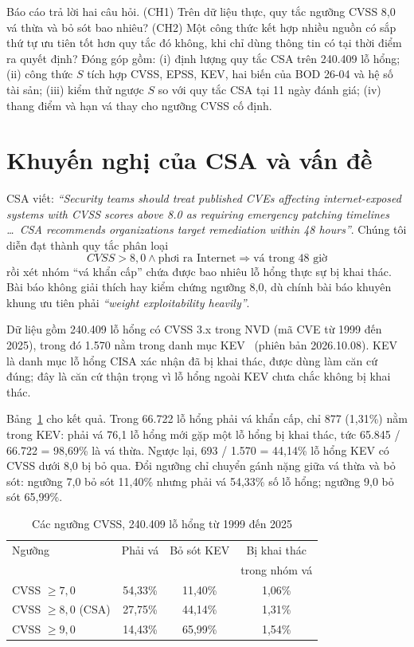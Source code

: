 \documentclass[conference]{IEEEtran}
\begin{document}
Báo cáo trả lời hai câu hỏi. (CH1) Trên dữ liệu thực, quy tắc ngưỡng CVSS 8,0 vá thừa và bỏ sót bao nhiêu? (CH2)
Một công thức kết hợp nhiều nguồn có sắp thứ tự ưu tiên tốt hơn quy tắc đó không, khi chỉ dùng thông tin có tại
thời điểm ra quyết định? Đóng góp gồm: (i) định lượng quy tắc CSA trên 240.409 lỗ hổng; (ii) công thức $S$ tích hợp
CVSS, EPSS, KEV, hai biến của BOD 26-04 và hệ số tài sản; (iii) kiểm thử ngược $S$ so với quy tắc CSA tại 11 ngày
đánh giá; (iv) thang điểm và hạn vá thay cho ngưỡng CVSS cố định.

\section{Khuyến nghị của CSA và vấn đề}\label{sec:csa}

CSA viết: \emph{``Security teams should treat published CVEs affecting internet-exposed systems with CVSS scores
above 8.0 as requiring emergency patching timelines \ldots\ CSA recommends organizations target remediation within
48 hours''}. Chúng tôi diễn đạt thành quy tắc phân loại
\begin{equation}
\mathit{CVSS} > 8{,}0 \wedge \text{phơi ra Internet} \Longrightarrow \text{vá trong 48 giờ}
\label{eq:csa}
\end{equation}
rồi xét nhóm ``vá khẩn cấp'' chứa được bao nhiêu lỗ hổng thực sự bị khai thác. Bài báo không giải thích hay kiểm
chứng ngưỡng 8,0, dù chính bài báo khuyên khung ưu tiên phải \emph{``weight exploitability heavily''}.

Dữ liệu gồm 240.409 lỗ hổng có CVSS 3.x trong NVD (mã CVE từ 1999 đến 2025), trong đó 1.570 nằm trong danh mục
KEV~\cite{kev} (phiên bản 2026.10.08). KEV là danh mục lỗ hổng CISA xác nhận đã bị khai thác, được dùng làm căn cứ
đúng; đây là căn cứ thận trọng vì lỗ hổng ngoài KEV chưa chắc không bị khai thác.

Bảng~\ref{tab:nguong} cho kết quả. Trong 66.722 lỗ hổng phải vá khẩn cấp, chỉ 877 (1,31\%) nằm trong KEV: phải vá
76,1 lỗ hổng mới gặp một lỗ hổng bị khai thác, tức 65.845 / 66.722 = 98,69\% là vá thừa. Ngược lại, 693 / 1.570 =
44,14\% lỗ hổng KEV có CVSS dưới 8,0 bị bỏ qua. Đổi ngưỡng chỉ chuyển gánh nặng giữa vá thừa và bỏ sót: ngưỡng 7,0
bỏ sót 11,40\% nhưng phải vá 54,33\% số lỗ hổng; ngưỡng 9,0 bỏ sót 65,99\%.

\begin{table}[htbp]
\caption{Các ngưỡng CVSS, 240.409 lỗ hổng từ 1999 đến 2025}\label{tab:nguong}
\centering
\begin{tabular}{lccc}
\toprule
Ngưỡng & Phải vá & Bỏ sót KEV & Bị khai thác \\
 & & & trong nhóm vá \\
\midrule
CVSS $\ge 7{,}0$ & 54,33\% & 11,40\% & 1,06\% \\
CVSS $\ge 8{,}0$ (CSA) & 27,75\% & 44,14\% & 1,31\% \\
CVSS $\ge 9{,}0$ & 14,43\% & 65,99\% & 1,54\% \\
\bottomrule
\end{tabular}
\end{table}
\end{document}
